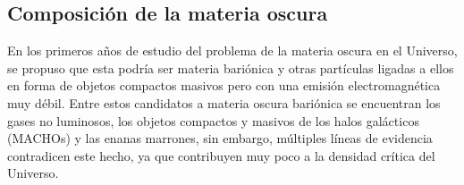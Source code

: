 \subsection{Composición de la materia oscura}

En los primeros a\~nos de estudio del problema de la materia oscura en el Universo, se propuso que esta podría ser materia bariónica y otras partículas ligadas a ellos en forma de objetos compactos masivos pero con una emisión electromagnética muy débil. Entre estos candidatos a materia oscura bariónica se encuentran los gases no luminosos, los objetos compactos y masivos de los halos galácticos (MACHOs) y las enanas marrones, sin embargo, múltiples líneas de evidencia contradicen este hecho, ya que contribuyen muy poco a la densidad crítica del Universo.

